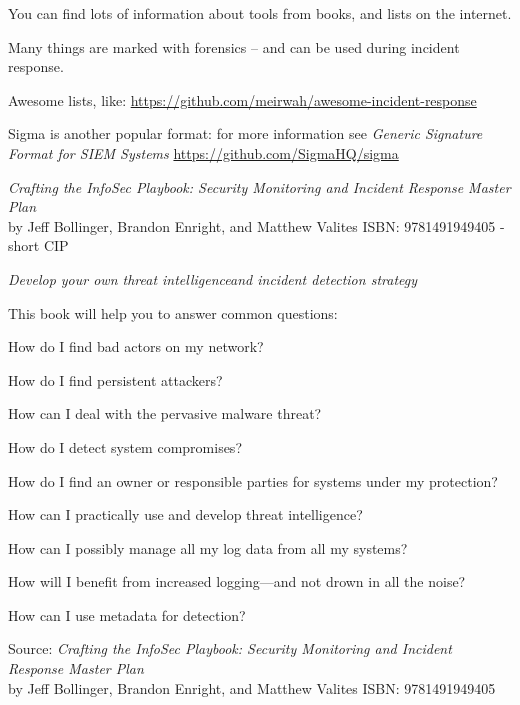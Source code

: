 \documentclass[Screen16to9,17pt]{foils}
\begin{document}





You can find lots of information about tools from books, and lists on the internet.

Many things are marked with forensics -- and can be used during incident response.

\begin{list2}
    \item Awesome lists, like: \url{https://github.com/meirwah/awesome-incident-response}
    \item Sigma is another popular format: for more information see \emph{Generic Signature Format for SIEM Systems}
    \url{https://github.com/SigmaHQ/sigma}
\end{list2}




\emph{Crafting the InfoSec Playbook: Security Monitoring and Incident Response Master Plan}\\
 by Jeff Bollinger, Brandon Enright, and Matthew Valites ISBN: 9781491949405 - short CIP

\emph{Develop your own threat intelligenceand incident detection strategy}



This book will help you to answer common questions:
\begin{list2}
\item How do I find bad actors on my network?
\item How do I find persistent attackers?
\item How can I deal with the pervasive malware threat?
\item How do I detect system compromises?
\item How do I find an owner or responsible parties for systems under my protection?
\item How can I practically use and develop threat intelligence?
\item How can I possibly manage all my log data from all my systems?
\item How will I benefit from increased logging—and not drown in all the noise?
\item How can I use metadata for detection?
\end{list2}
Source: \emph{Crafting the InfoSec Playbook: Security Monitoring and Incident Response Master Plan}\\
 by Jeff Bollinger, Brandon Enright, and Matthew Valites ISBN: 9781491949405
\end{document}
